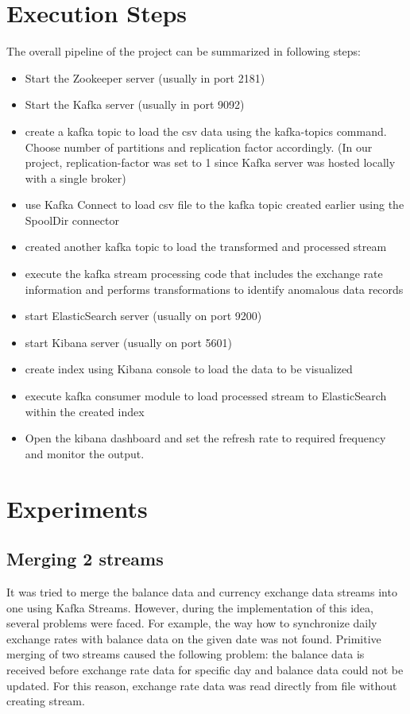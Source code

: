 \documentclass{article}
\begin{document}
\section{Execution Steps}
The overall pipeline of the project can be summarized in following steps:
\begin{itemize}
    \item Start the Zookeeper server (usually in port 2181)
    \item Start the Kafka server (usually in port 9092)
    \item create a kafka topic to load the csv data using the kafka-topics command. Choose number of partitions and replication factor accordingly. (In our project, replication-factor was set to 1 since Kafka server was hosted locally with a single broker)
    \item use Kafka Connect to load csv file to the kafka topic created earlier using the SpoolDir connector
    \item created another kafka topic to load the transformed and processed stream
    \item execute the kafka stream processing code that includes the exchange rate information and performs transformations to identify anomalous data records
    \item start ElasticSearch server (usually on port 9200)
    \item start Kibana server (usually on port 5601)
    \item create index using Kibana console to load the data to be visualized
    \item execute kafka consumer module to load processed stream to ElasticSearch within the created index
    \item Open the kibana dashboard and set the refresh rate to required frequency and monitor the output. 
\end{itemize}

\section{Experiments}

\subsection{Merging 2 streams}

It was tried to merge the balance data and currency exchange data streams into one using Kafka Streams. However, during the implementation of this idea, several problems were faced. For example, the way how to synchronize daily exchange rates with balance data on the given date was not found. Primitive merging of two streams caused the following problem: the balance data is received before exchange rate data for specific day and balance data could not be updated. For this reason, exchange rate data was read directly from file without creating stream.
\end{document}
